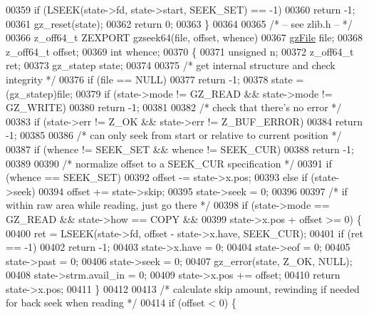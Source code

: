 \begin{DoxyCode}
{{{{00359     \textcolor{keywordflow}{if} (LSEEK(state->fd, state->start, SEEK\_SET) == -1)
00360         \textcolor{keywordflow}{return} -1;
00361     gz\_reset(state);
00362     \textcolor{keywordflow}{return} 0;
00363 \}
00364 
00365 \textcolor{comment}{/* -- see zlib.h -- */}
00366 z\_off64\_t ZEXPORT gzseek64(file, offset, whence)
00367     \hyperlink{structgz_file__s}{gzFile} file;
00368     z\_off64\_t offset;
00369     \textcolor{keywordtype}{int} whence;
00370 \{
00371     \textcolor{keywordtype}{unsigned} n;
00372     z\_off64\_t ret;
00373     gz\_statep state;
00374 
00375     \textcolor{comment}{/* get internal structure and check integrity */}
00376     \textcolor{keywordflow}{if} (file == NULL)
00377         \textcolor{keywordflow}{return} -1;
00378     state = (gz\_statep)file;
00379     \textcolor{keywordflow}{if} (state->mode != GZ\_READ && state->mode != GZ\_WRITE)
00380         \textcolor{keywordflow}{return} -1;
00381 
00382     \textcolor{comment}{/* check that there's no error */}
00383     \textcolor{keywordflow}{if} (state->err != Z\_OK && state->err != Z\_BUF\_ERROR)
00384         \textcolor{keywordflow}{return} -1;
00385 
00386     \textcolor{comment}{/* can only seek from start or relative to current position */}
00387     \textcolor{keywordflow}{if} (whence != SEEK\_SET && whence != SEEK\_CUR)
00388         \textcolor{keywordflow}{return} -1;
00389 
00390     \textcolor{comment}{/* normalize offset to a SEEK\_CUR specification */}
00391     \textcolor{keywordflow}{if} (whence == SEEK\_SET)
00392         offset -= state->x.pos;
00393     \textcolor{keywordflow}{else} \textcolor{keywordflow}{if} (state->seek)
00394         offset += state->skip;
00395     state->seek = 0;
00396 
00397     \textcolor{comment}{/* if within raw area while reading, just go there */}
00398     \textcolor{keywordflow}{if} (state->mode == GZ\_READ && state->how == COPY &&
00399             state->x.pos + offset >= 0) \{
00400         ret = LSEEK(state->fd, offset - state->x.have, SEEK\_CUR);
00401         \textcolor{keywordflow}{if} (ret == -1)
00402             \textcolor{keywordflow}{return} -1;
00403         state->x.have = 0;
00404         state->eof = 0;
00405         state->past = 0;
00406         state->seek = 0;
00407         gz\_error(state, Z\_OK, NULL);
00408         state->strm.avail\_in = 0;
00409         state->x.pos += offset;
00410         \textcolor{keywordflow}{return} state->x.pos;
00411     \}
00412 
00413     \textcolor{comment}{/* calculate skip amount, rewinding if needed for back seek when reading */}
00414     \textcolor{keywordflow}{if} (offset < 0) \{
}}}}
\end{DoxyCode}

